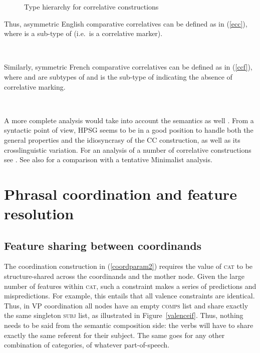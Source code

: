 {\begin{figure}
\caption{Type hierarchy for correlative constructions}\label{figcorr}
\end{figure}


Thus,  asymmetric English comparative correlatives  can be defined as
in (\ref{ecc}), where  is a sub-type of  (i.e.\ is a correlative marker).

\ea
\label{ecc}
 \impl\\ %
\z

\noindent
Similarly,  symmetric French comparative correlatives can be  defined as
in (\ref{ccf}), where  and  are subtypes of  and   is the sub-type of  indicating
the absence of  correlative marking.

\ea
\label{ccf}
 \impl\\ %
\z

A more complete analysis would take into account the semantics as well \citep[Section~5.5]{fgsag08}. From a syntactic point of view, HPSG seems to be in a good position to handle both the general properties and the idiosyncrasy of the CC construction, as well as its crosslinguistic variation. 
For an analysis of a number of  correlative constructions see \citet{Alqurashi:Borsley:14}.
See also  \citet{Borsley:11} for a comparison with a tentative Minimalist analysis.


\section{Phrasal coordination and feature resolution}

\subsection{Feature sharing between coordinands}

The coordination construction in (\ref{coordparam2}) requires the value of \textsc{cat} to be structure-shared across the coordinands and the mother node. Given the large number of features within \textsc{cat}, such a constraint makes a series of predictions and mispredictions.
For example, this entails that all valence constraints are identical. Thus, in VP coordination all nodes have an empty \textsc{comps} list and share exactly the same singleton \textsc{subj} list, as illustrated in Figure~\ref{valenceif}. Thus, nothing needs to be said from the semantic composition side: the verbs will have to share exactly the same referent for their subject. The same goes for any other combination of categories, of whatever part-of-speech.

}
